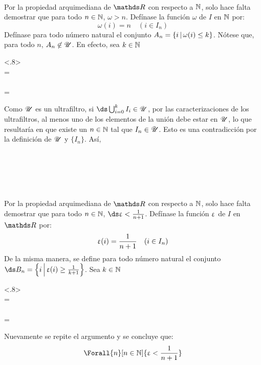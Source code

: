 \begin{demo}~
  \item Por la propiedad arquimediana de $\R$ con respecto a $\mathbb{N}$, solo hace falta
        demostrar que para todo $n\in\mathbb{N}$, $\omega > n$.
        Defínase la función $\omega$ de $I$ en $\mathbb{N}$ por:
        \[\omega(i) = n\quad (i\in I_n)\]
        Defínase para todo número natural el conjunto $A_n=\left\{i\,\middle|\,\omega(i)\leq k\right\}$.
        Nótese que, para todo $n$, $A_n\not\in\mathscr{U}$. En efecto, sea $k\in\mathbb{N}$
        \begin{longderivation}<.8>
            \\
          =\\
            \\
          =\\
        \end{longderivation}
        Como $\mathscr{U}$ es un ultrafiltro, si $\ds\bigcup_{i=0}^k I_i\in\U$, por las
        caracterizaciones de los ultrafiltros, al menos uno de los
        elementos de la unión debe estar en $\mathscr{U}$, lo que resultaría en
        que existe un $n\in\mathbb{N}$ tal que $I_n\in\mathscr{U}$. Esto es una
        contradicción por la definición de $\mathscr{U}$ y $\{I_n\}$. Así,
        \begin{longderivation}
            \\
          \\
            \\
          \equiv\\
        \end{longderivation}
  \item Por la propiedad arquimediana de $\R$ con respecto a $\mathbb{N}$, solo
        hace falta demostrar que para todo
        $n\in\mathbb{N}$, $\ds\e < \frac{1}{n+1}$. Defínase la función $\upvarepsilon$ de $I$
        en $\R$ por:
        \[\upvarepsilon(i)=\frac{1}{n+1} \quad (i\in I_n)\]
        De la misma manera, se define para todo número natural el
        conjunto $\ds B_n=\set{i}{\e(i)\geq \frac{1}{k+1}}$. Sea $k\in\mathbb{N}$
        \begin{longderivation}<.8>
            \\
          =\\
            \\
          =\\
        \end{longderivation}
        Nuevamente se repite el argumento y se concluye que:
        \[\Forall{n}[n\in\N]{\e < \frac{1}{n+1}}\]
\end{demo}

